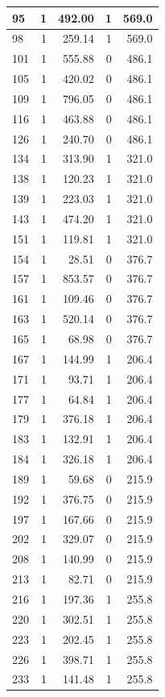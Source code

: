 \documentclass[
  spanish,
  12pt,
]{book}
\begin{document}
\begin{tabular}{l|r|r|r|r}
\hline
95 & 1 & 492.00 & 1 & 569.0\\
\hline
98 & 1 & 259.14 & 1 & 569.0\\
\hline
101 & 1 & 555.88 & 0 & 486.1\\
\hline
105 & 1 & 420.02 & 0 & 486.1\\
\hline
109 & 1 & 796.05 & 0 & 486.1\\
\hline
116 & 1 & 463.88 & 0 & 486.1\\
\hline
126 & 1 & 240.70 & 0 & 486.1\\
\hline
134 & 1 & 313.90 & 1 & 321.0\\
\hline
138 & 1 & 120.23 & 1 & 321.0\\
\hline
139 & 1 & 223.03 & 1 & 321.0\\
\hline
143 & 1 & 474.20 & 1 & 321.0\\
\hline
151 & 1 & 119.81 & 1 & 321.0\\
\hline
154 & 1 & 28.51 & 0 & 376.7\\
\hline
157 & 1 & 853.57 & 0 & 376.7\\
\hline
161 & 1 & 109.46 & 0 & 376.7\\
\hline
163 & 1 & 520.14 & 0 & 376.7\\
\hline
165 & 1 & 68.98 & 0 & 376.7\\
\hline
167 & 1 & 144.99 & 1 & 206.4\\
\hline
171 & 1 & 93.71 & 1 & 206.4\\
\hline
177 & 1 & 64.84 & 1 & 206.4\\
\hline
179 & 1 & 376.18 & 1 & 206.4\\
\hline
183 & 1 & 132.91 & 1 & 206.4\\
\hline
184 & 1 & 326.18 & 1 & 206.4\\
\hline
189 & 1 & 59.68 & 0 & 215.9\\
\hline
192 & 1 & 376.75 & 0 & 215.9\\
\hline
197 & 1 & 167.66 & 0 & 215.9\\
\hline
202 & 1 & 329.07 & 0 & 215.9\\
\hline
208 & 1 & 140.99 & 0 & 215.9\\
\hline
213 & 1 & 82.71 & 0 & 215.9\\
\hline
216 & 1 & 197.36 & 1 & 255.8\\
\hline
220 & 1 & 302.51 & 1 & 255.8\\
\hline
223 & 1 & 202.45 & 1 & 255.8\\
\hline
226 & 1 & 398.71 & 1 & 255.8\\
\hline
233 & 1 & 141.48 & 1 & 255.8\\

\end{tabular}
\end{document}
